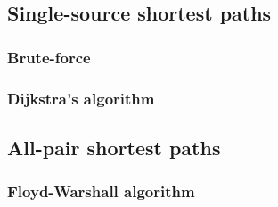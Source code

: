 \subsection{Single-source shortest paths}

\subsubsection{Brute-force}

\subsubsection{Dijkstra's algorithm}

\subsection{All-pair shortest paths}

\subsubsection{Floyd-Warshall algorithm}